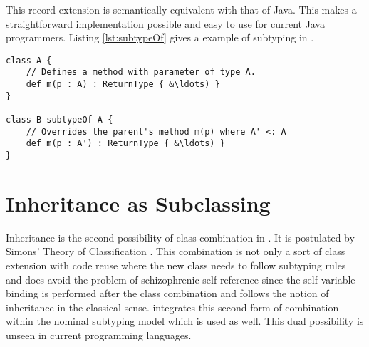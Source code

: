 This record extension is semantically equivalent with that of Java. This
makes a straightforward implementation possible and easy to use for
current Java programmers. Listing \ref{lst:subtypeOf} gives a example
of subtyping in \ooplss.

\begin{lstlisting}[language=ooplss,caption=Subtyping in \ooplss,label=lst:subtypeOf]
class A {
	// Defines a method with parameter of type A.
	def m(p : A) : ReturnType { &\ldots) }
}

class B subtypeOf A {
	// Overrides the parent's method m(p) where A' <: A
	def m(p : A') : ReturnType { &\ldots) }
}
\end{lstlisting}

%
%
%
%

\section{Inheritance as Subclassing}
Inheritance is the second possibility of class combination in \ooplss. It
is postulated by Simons' Theory of Classification \cite{simons_theory_2004-2}.
This combination is not only a sort of class extension with code reuse where
the new class needs to follow subtyping rules and does avoid the problem of
schizophrenic self-reference since the self-variable binding is performed after
the class combination and follows the notion of inheritance in the
classical sense. \ooplss integrates this second form of combination within
the nominal subtyping model which is used as well. This dual possibility is
unseen in current programming languages.

